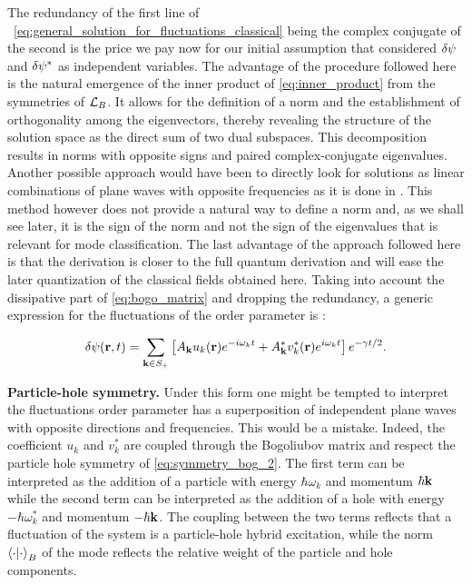 The redundancy of the first line of ~\eqref{eq:general_solution_for_fluctuations_classical} being the complex conjugate of the second is the price we pay now for our initial assumption that considered $\delta\psi$ and $\delta\psi^*$ as independent variables. The advantage of the
procedure followed here is the natural emergence of the inner product of \autoref{eq:inner_product} from the symmetries of $\mathcal{L}_B$. It allows for the definition of a norm and the establishment of orthogonality among the eigenvectors, 
thereby revealing the structure of the solution space as the direct sum of two dual subspaces. This decomposition results in norms with opposite signs and paired complex-conjugate eigenvalues. Another possible approach would have been
to directly look for solutions as linear combinations of plane waves with opposite frequencies as it is done in \cite{pethick_bose-einstein_2008}. This method however does not provide a natural way to define a norm and, as we shall
see later, it is the sign of the norm and not the sign of the eigenvalues that is relevant for mode classification. The last advantage of the approach followed here is that the derivation
is closer to the full quantum derivation and will ease the later quantization of the classical fields obtained here. Taking into account the dissipative part of \autoref{eq:bogo_matrix} and dropping the redundancy, a generic
expression for the fluctuations of the order parameter is :

\begin{equation}
    \delta\psi(\mathbf{r},t) = \sum_{\mathbf{k} \in S_+} \left[A_{\mathbf{k}} u_k(\mathbf{r})e^{-i\omega_kt}+A_{\mathbf{k}}^*v_k^*(\mathbf{r})e^{i\omega_kt}\right]e^{-\gamma t/2}.
    \label{eq:fluctuation_order_parameter}
\end{equation}
\bigskip

\textbf{Particle-hole symmetry.} Under this form one might be tempted to interpret the fluctuations order parameter has a superposition of independent plane waves with opposite directions and frequencies.
This would be a mistake. Indeed, the coefficient $u_k$ and $v_k^*$ are coupled through the Bogoliubov matrix and respect the particle hole symmetry of \autoref{eq:symmetry_bog_2}. The first term
can be interpreted as the addition of a particle with energy $\hbar\omega_k$ and momentum $\hbar\mathbf{k}$ while the second term can be interpreted as the addition of a hole with energy $-\hbar\omega_k^*$ and momentum $-\hbar\mathbf{k}$. The coupling
between the two terms reflects that a fluctuation of the system is a particle-hole hybrid excitation, while the norm $\bra{\cdot}\ket{\cdot}_B$ of the mode reflects the relative weight of the particle and hole components.


